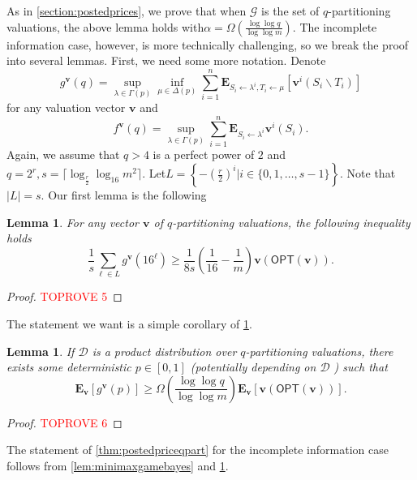 \documentclass[11pt]{article}\usepackage{amsfonts}
\newtheorem{lemma}[theorem]{Lemma}
\numberwithin{theorem}{subsection}
\newcommand{\boldv}{\mathbf{v}}
\newcommand{\opt}{\mathsf{OPT}}
\newcommand{\expect}{\mathbf{E}}
\begin{document}
\noindent
As in \cref{section:postedprices}, we prove that when $\mathcal{G}$ is the set of $q$-partitioning valuations, the above lemma holds with\linebreak $\alpha = \Omega\left(\frac{\log \log q}{\log \log m}\right).$ The incomplete information case, however, is more technically challenging, so we break the proof into several lemmas. First, we need some more notation. Denote
$$
g^\boldv(q) = 
\sup_{\lambda \in \Gamma(p)}
\inf_{\mu \in \Delta(p)}
\sum_{i = 1}^n 
\expect_{S_i\longleftarrow \lambda^i, T_i \longleftarrow \mu}[\boldv^i(S_i\backslash T_i)]
$$
for any valuation vector $\boldv$ and
$$
f^\boldv(q) = 
\sup_{\lambda \in \Gamma(p)}
\sum_{i = 1}^n 
\expect_{S_i\longleftarrow \lambda^i}\boldv^i(S_i).
$$
Again, we assume that $q>4$ is a perfect power of $2$ and $q = 2^r,s = \lceil\log_{\frac{r}{2}}\log_{16} m^2\rceil.$
Let\linebreak $\displaystyle L = \left\{ {- \left(\frac{r}{2}\right)^i}|
i \in \{0,1,\ldots, s-1\}\right\}
.$ Note that $|L| = s .$ Our first lemma is the following 

\begin{lemma}
\label{lem:postedpriceswithoutexpectation}
For any vector $\boldv$ of $q$-partitioning valuations, the following inequality holds
$$
\frac{1}{s}\sum_{\ell \in L}
g^\boldv(16^\ell)\ge 
\frac{1}{8s}
\left(\frac{1}{16} - \frac{1}{m}\right)
\boldv(\opt(\boldv)).
$$
\end{lemma}
\begin{proof}\textcolor{red}{TOPROVE 5}\end{proof}

\noindent
The statement we want is a simple corollary of \cref{lem:postedpriceswithoutexpectation}. 

\begin{lemma}
\label{lem:bayesianpostedprice}
If $\mathcal{D}$ is a product distribution over $q$-partitioning valuations, there exists some deterministic $p\in [0,1]$ (potentially 
depending on $\mathcal{D}$
) such that 
$$
\expect_\boldv\left[
g^\boldv(p)
\right] \ge 
\Omega\left(\frac{\log \log q}{\log \log m}\right)
\expect_\boldv[\boldv(\opt(\boldv))].
$$
\end{lemma}
\begin{proof}\textcolor{red}{TOPROVE 6}\end{proof}

\noindent
The statement of 
\cref{thm:postedpriceqpart} for the incomplete information case follows from
\cref{lem:minimaxgamebayes} and\linebreak 
\cref{lem:bayesianpostedprice}.
\end{document}
